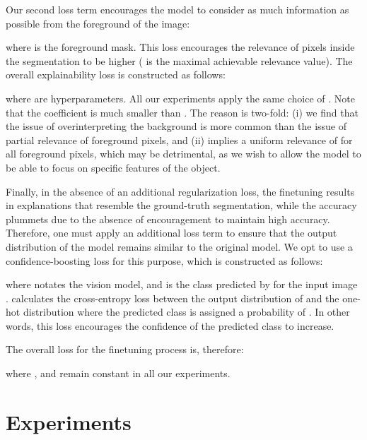 \documentclass{article}
\begin{document}
Our second loss term encourages the model to consider as much information as possible from the foreground of the image:

where  is the foreground mask. This loss encourages the relevance of pixels inside the segmentation to be higher ( is the maximal achievable relevance value). The overall explainability loss is constructed as follows:

where  are hyperparameters. All our experiments apply the same choice of  . Note that the coefficient  is much smaller than . The reason is two-fold: (i) we find that the issue of overinterpreting the background is more common than the issue of partial relevance of foreground pixels, and (ii)  implies a uniform relevance of  for all foreground pixels, which may be detrimental, as we wish to allow the model to be able to focus on specific features of the object.   

Finally, in the absence of an additional regularization loss, the finetuning results in explanations that resemble the ground-truth segmentation, while the accuracy plummets due to the absence of encouragement to maintain high accuracy. 
Therefore, one must apply an additional loss term to ensure that the output distribution of the model remains similar to the original model. We opt to use a confidence-boosting loss for this purpose, which is constructed as follows:

where  notates the vision model, and  is the class predicted by  for the input image .  calculates the cross-entropy loss between the output distribution of  and the one-hot distribution where the predicted class is assigned a probability of . In other words, this loss encourages the confidence of the predicted class to increase.


The overall loss for the finetuning process is, therefore:

where , and  remain constant in all our experiments. 


\section{Experiments}
\end{document}
